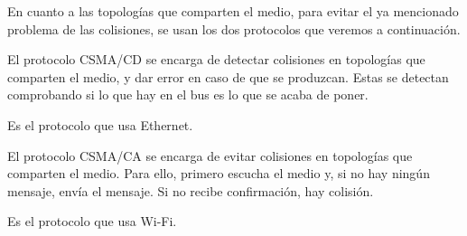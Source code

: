 En cuanto a las topologías que comparten el medio, para evitar el ya mencionado problema de las colisiones, se usan los dos protocolos que veremos a continuación.
\begin{definicion}[CSMA/CD]
    El protocolo \acrfull{CSMA/CD} se encarga de detectar colisiones en topologías que comparten el medio, y dar error en caso de que se produzcan. Estas se detectan comprobando si lo que hay en el bus es lo que se acaba de poner.

    Es el protocolo que usa Ethernet.
\end{definicion}

\begin{definicion}[CSMA/CA]
    El protocolo \acrfull{CSMA/CA} se encarga de evitar colisiones en topologías que comparten el medio. Para ello, primero escucha el medio y, si no hay ningún mensaje, envía el mensaje. Si no recibe confirmación, hay colisión.

    Es el protocolo que usa Wi-Fi.
\end{definicion}


